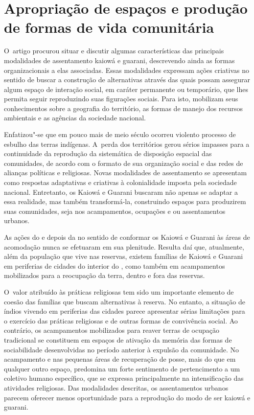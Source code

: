 \section{Apropriação de espaços e produção de formas de vida comunitária}

O~artigo procurou situar e discutir algumas características das
principais modalidades de assentamento kaiowá e guarani, descrevendo
ainda as formas organizacionais a elas associadas. Essas modalidades
expressam ações criativas no sentido de buscar a construção de
alternativas através das quais possam assegurar algum espaço de
interação social, em caráter permanente ou temporário, que lhes permita
seguir reproduzindo suas figurações sociais. Para isto, mobilizam seus
conhecimentos sobre a geografia do território, as formas de manejo dos
recursos ambientais e as agências da sociedade nacional. 

Enfatizou"-se que em pouco mais de meio século ocorreu violento processo
de esbulho das terras indígenas. A~perda dos territórios gerou sérios
impasses para a continuidade da reprodução da sistemática de disposição
espacial das comunidades, de acordo com o formato de sua organização
social e das redes de alianças políticas e religiosas. Novas
modalidades de assentamento se apresentam como respostas adaptativas e
criativas à colonialidade imposta pela sociedade nacional. Entretanto,
os Kaiowá e Guarani buscaram não apenas se adaptar a essa realidade,
mas também transformá-la, construindo espaços para produzirem suas
comunidades, seja nos acampamentos, ocupações e ou assentamentos
urbanos.

As ações do  e depois da  no sentido de conformar os Kaiowá e
Guarani às áreas de acomodação nunca se efetuaram em sua plenitude.
Resulta daí que, atualmente, além da população que vive nas reservas,
existem famílias de Kaiowá e Guarani em periferias de cidades do
interior do , como também em acampamentos mobilizados para a
reocupação da terra, dentro e fora das reservas.

O~valor atribuído às práticas religiosas tem sido um importante elemento
de coesão das famílias que buscam alternativas à reserva. No entanto, a
situação de índios vivendo em periferias das cidades parece apresentar
sérias limitações para o exercício das práticas religiosas e de outras
formas de convivência social. Ao contrário, os acampamentos mobilizados
para reaver terras de ocupação tradicional se constituem em espaços de
ativação da memória das formas de sociabilidade desenvolvidas no
período anterior à expulsão da comunidade. No acampamento e nas
pequenas áreas de recuperação de posse, mais do que em qualquer outro
espaço, predomina um forte sentimento de pertencimento a um coletivo
humano específico, que se expressa principalmente na intensificação das
atividades religiosas. Das modalidades descritas, os assentamentos
urbanos parecem oferecer menos oportunidade para a reprodução do modo
de ser kaiowá e guarani. 

